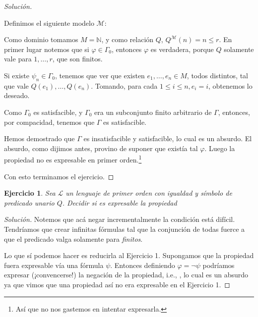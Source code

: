\documentclass[10pt,a4paper]{article}
\def\N{\mathbb{N}}
\def\l{\mathcal{L}}
\def\p{\psi}
\newenvironment{solution}
  {\renewcommand\qedsymbol{$\blacksquare$}\begin{proof}[Solución]}
  {\end{proof}}
\newtheorem{xca}{Ejercicio}
\begin{document}
\begin{solution}
\begin{enumerate}
\begin{enumerate}[label=\alph*)]
  	  Definimos el siguiente modelo $\mathcal{M}$:
  	  
  	  Como dominio tomamos $M = \N$, y como relación $Q$, $Q^{\mathcal{M}}(n) = n \leq r$. En primer lugar notemos que si $\varphi \in \Gamma_0$, entonces $\varphi$ es verdadera, porque $Q$ solamente vale para $1,\dots,r$, que son finitos.
  	  
  	  Si existe $\p_n \in \Gamma_0$, tenemos que ver que existen $e_1,\dots,e_n \in M$, todos distintos, tal que vale $Q(e_1),\dots,Q(e_n)$. Tomando, para cada $1\leq i \leq n, e_i = i$, obtenemos lo deseado.
  	  
  Como $\Gamma_0$ es satisfacible, y $\Gamma_0$ era un subconjunto finito arbitrario de $\Gamma$, entonces, por compacidad, tenemos que $\Gamma$ es satisfacible.
  \end{enumerate}
  
  Hemos demostrado que $\Gamma$ es insatisfacible y satisfacible, lo cual es un absurdo. El absurdo, como dijimos antes, provino de suponer que existía tal $\varphi$. Luego la propiedad no es expresable en primer orden.\footnote{Así que no nos gastemos en intentar expresarla.}
\end{enumerate}

Con esto terminamos el ejercicio.
\end{solution}



\begin{xca}Sea $\l$ un lenguaje de primer orden con igualdad y símbolo de predicado unario $Q$. Decidir si es expresable la propiedad 
\end{xca}

\begin{solution}
Notemos que acá negar incrementalmente la condición  está difícil. Tendríamos que crear infinitas fórmulas tal que la conjunción de todas fuerce a que el predicado valga solamente para \emph{finitos}.

Lo que sí podemos hacer es reducirla al Ejercicio 1. Supongamos que la propiedad fuera expresable vía una fórmula $\psi$. Entonces definiendo $\varphi = \neg \psi$ podríamos expresar (¡convencerse!) la negación de la propiedad, i.e., , lo cual es un absurdo ya que vimos que una propiedad así no era expresable en el Ejercicio 1.
\end{solution}
\end{document}

